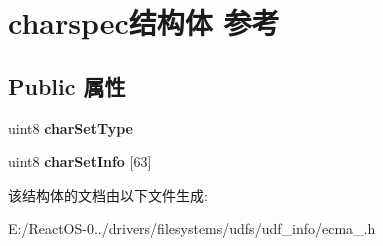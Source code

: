\hypertarget{structcharspec}{}\section{charspec结构体 参考}
\label{structcharspec}
\subsection*{Public 属性}
\begin{DoxyCompactItemize}
\item 
\mbox{\label{structcharspec_a0354f780075b3c7f1c66f913c23ee507}} 
uint8 {\bfseries char\+Set\+Type}
\item 
\mbox{\label{structcharspec_ac62ad54d377c0c04d951fb6d998dc73c}} 
uint8 {\bfseries char\+Set\+Info} \mbox{[}63\mbox{]}
\end{DoxyCompactItemize}


该结构体的文档由以下文件生成\+:\begin{DoxyCompactItemize}
\item 
E\+:/\+React\+O\+S-\/0../drivers/filesystems/udfs/udf\+\_\+info/ecma\+\_.\+h\end{DoxyCompactItemize}
